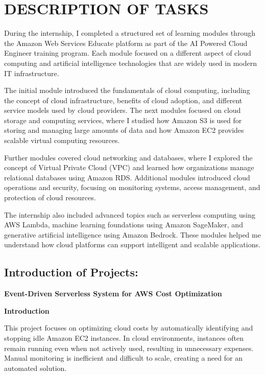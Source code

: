 \documentclass[12pt, a4paper, oneside]{report}
\begin{document}
\chapter{DESCRIPTION OF TASKS}

During the internship, I completed a structured set of learning modules through the 
Amazon Web Services Educate platform as part of the AI Powered Cloud Engineer 
training program. Each module focused on a different aspect of cloud computing and 
artificial intelligence technologies that are widely used in modern IT infrastructure.

The initial module introduced the fundamentals of cloud computing, including the 
concept of cloud infrastructure, benefits of cloud adoption, and different service models 
used by cloud providers. The next modules focused on cloud storage and computing 
services, where I studied how Amazon S3 is used for storing and managing large 
amounts of data and how Amazon EC2 provides scalable virtual computing resources.

Further modules covered cloud networking and databases, where I explored the concept 
of Virtual Private Cloud (VPC) and learned how organizations manage relational 
databases using Amazon RDS. Additional modules introduced cloud operations and 
security, focusing on monitoring systems, access management, and protection of cloud 
resources.

The internship also included advanced topics such as serverless computing using AWS 
Lambda, machine learning foundations using Amazon SageMaker, and generative 
artificial intelligence using Amazon Bedrock. These modules helped me understand how 
cloud platforms can support intelligent and scalable applications.
\newpage
\section{Introduction of Projects:}

\noindent\textbf{\large Event-Driven Serverless System for AWS Cost Optimization}

\vspace{0.3cm}
\noindent\textbf{Introduction}

This project focuses on optimizing cloud costs by automatically identifying and stopping 
idle Amazon EC2 instances. In cloud environments, instances often remain running even 
when not actively used, resulting in unnecessary expenses. Manual monitoring is 
inefficient and difficult to scale, creating a need for an automated solution.
\end{document}
